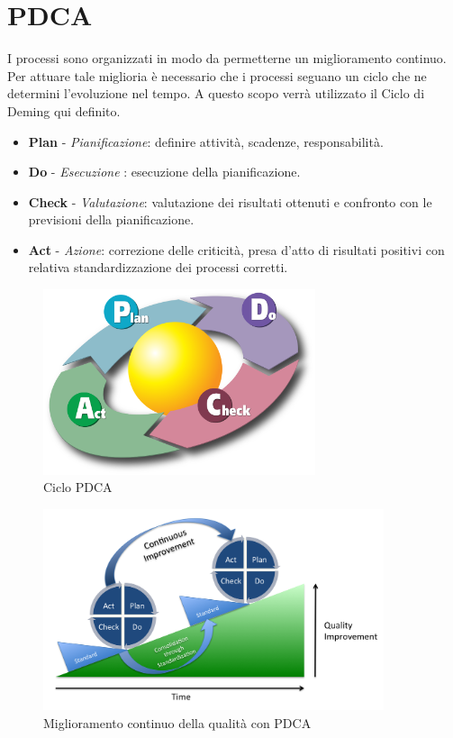 \section{PDCA}\label{app:pdca}
I processi sono organizzati in modo da permetterne un miglioramento continuo.\\
Per attuare tale miglioria è necessario che i processi seguano un ciclo che ne determini l'evoluzione nel tempo.
A questo scopo verrà utilizzato il Ciclo di Deming qui definito.
\begin{itemize}
	\item \textbf{Plan} - \textit{Pianificazione}: definire attività, scadenze, responsabilità.
	\item \textbf{Do} - \textit{Esecuzione} : esecuzione della pianificazione.
	\item \textbf{Check} - \textit{Valutazione}: valutazione dei risultati ottenuti e confronto con le previsioni della pianificazione. 
	\item \textbf{Act} - \textit{Azione}: correzione delle criticità, presa d’atto di risultati positivi con relativa standardizzazione dei processi corretti.
\end{itemize}
\begin{figure}[H]	
	\centering
	\includegraphics[width=8cm]{PDCA.png}
	\caption{Ciclo PDCA}
\end{figure}
\begin{figure}[H]
	\centering
	\includegraphics[width=10cm]{PDCAProcess}
	\caption{Miglioramento continuo della qualità con PDCA}
\end{figure}